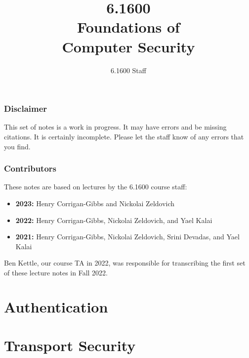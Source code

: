 \documentclass[
letterpaper, %
oneside,
nobib
]{tufte-book}
\author{6.1600 Staff}
\title{6.1600\\Foundations of\\Computer Security}
\begin{document}
\mainmatter

\maketitle

\section{Disclaimer}
This set of notes is a work in progress. It may have errors and be missing citations. It is certainly incomplete. Please let the staff know of any errors that you find.

\section{Contributors}
These notes are based on lectures by the 6.1600 course staff:
\begin{itemize}
  \item \textbf{2023:} Henry Corrigan-Gibbs and Nickolai Zeldovich
  \item \textbf{2022:} Henry Corrigan-Gibbs, Nickolai Zeldovich, and Yael Kalai
  \item \textbf{2021:} Henry Corrigan-Gibbs, Nickolai Zeldovich, Srini Devadas, and Yael Kalai
\end{itemize}
Ben Kettle, our course TA in 2022, was responsible for transcribing
the first set of these lecture notes in Fall 2022.

\clearpage

\tableofcontents*
\clearpage





\part{Authentication}








\part{Transport Security}





 
% 
\end{document}
